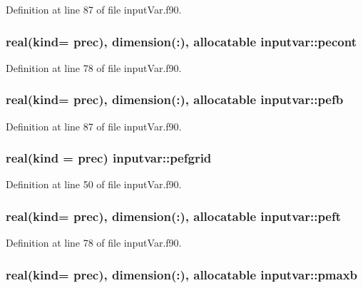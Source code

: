 Definition at line 87 of file input\-Var.\-f90.

\hypertarget{classinputvar_a1f575248c5370894cd5abbad18ace926}{
\subsubsection[{pecont}]{\setlength{\rightskip}{0pt plus 5cm}real(kind= prec), dimension(\-:), allocatable inputvar\-::pecont}}\label{classinputvar_a1f575248c5370894cd5abbad18ace926}


Definition at line 78 of file input\-Var.\-f90.

\hypertarget{classinputvar_a3484e64c94e8f61527a9843039243703}{
\subsubsection[{pefb}]{\setlength{\rightskip}{0pt plus 5cm}real(kind= prec), dimension(\-:), allocatable inputvar\-::pefb}}\label{classinputvar_a3484e64c94e8f61527a9843039243703}


Definition at line 87 of file input\-Var.\-f90.

\hypertarget{classinputvar_aeb238280e9c8d1526ff6c11142a32cda}{
\subsubsection[{pefgrid}]{\setlength{\rightskip}{0pt plus 5cm}real(kind = prec) inputvar\-::pefgrid}}\label{classinputvar_aeb238280e9c8d1526ff6c11142a32cda}


Definition at line 50 of file input\-Var.\-f90.

\hypertarget{classinputvar_ab6d8921a6209783f0f51673c842f94b5}{
\subsubsection[{peft}]{\setlength{\rightskip}{0pt plus 5cm}real(kind= prec), dimension(\-:), allocatable inputvar\-::peft}}\label{classinputvar_ab6d8921a6209783f0f51673c842f94b5}


Definition at line 78 of file input\-Var.\-f90.

\hypertarget{classinputvar_a29e37a8460969d1438ed9aeb5d37d798}{
\subsubsection[{pmaxb}]{\setlength{\rightskip}{0pt plus 5cm}real(kind= prec), dimension(\-:), allocatable inputvar\-::pmaxb}}\label{classinputvar_a29e37a8460969d1438ed9aeb5d37d798}


